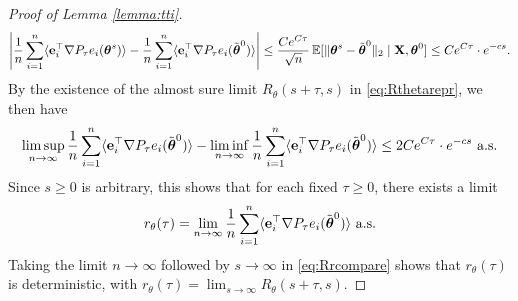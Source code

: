 \begin{proof}[Proof of Lemma \ref{lemma:tti}]
\begin{equation}\label{eq:Rrcompare}
\left|\frac{1}{n}\sum_{i=1}^n \langle \mathbf{e}_i^\top \nabla P_\tau
e_i(\boldsymbol{\theta}^s)\rangle-\frac{1}{n}\sum_{i=1}^n \langle \mathbf{e}_i^\top \nabla P_\tau
e_i(\tilde {\boldsymbol{\theta}}^0) \rangle\right|
\leq \frac{Ce^{C\tau}}{\sqrt{n}}\,
\mathbb{E}[\|\boldsymbol{\theta}^s-\tilde {\boldsymbol{\theta}}^0\|_2 \mid \mathbf{X},\boldsymbol{\theta}^0]
\leq Ce^{C\tau} \cdot e^{-cs}.
\end{equation}
By the existence of the almost sure limit
$R_\theta(s+\tau,s)$ in \eqref{eq:Rthetarepr}, we then have
\[\limsup_{n \to \infty} \frac{1}{n}\sum_{i=1}^n \langle \mathbf{e}_i^\top \nabla P_\tau
e_i(\tilde {\boldsymbol{\theta}}^0) \rangle
-\liminf_{n \to \infty} \frac{1}{n}\sum_{i=1}^n \langle \mathbf{e}_i^\top \nabla P_\tau
e_i(\tilde {\boldsymbol{\theta}}^0) \rangle \leq 2Ce^{C\tau} \cdot e^{-cs} \text{ a.s.}\]
Since $s \geq 0$ is arbitrary, this shows that for each fixed $\tau \geq 0$,
there exists a limit
\begin{equation}\label{eq:rthetadef}
r_\theta(\tau)=\lim_{n \to \infty}
\frac{1}{n}\sum_{i=1}^n \langle \mathbf{e}_i^\top \nabla P_\tau
e_i(\tilde {\boldsymbol{\theta}}^0) \rangle \text{ a.s.}
\end{equation}
Taking the limit $n \to \infty$ followed by $s \to \infty$ in
\eqref{eq:Rrcompare} shows that $r_\theta(\tau)$ is deterministic, with
$r_\theta(\tau)=\lim_{s \to \infty} R_\theta(s+\tau,s)$.


\end{proof}
